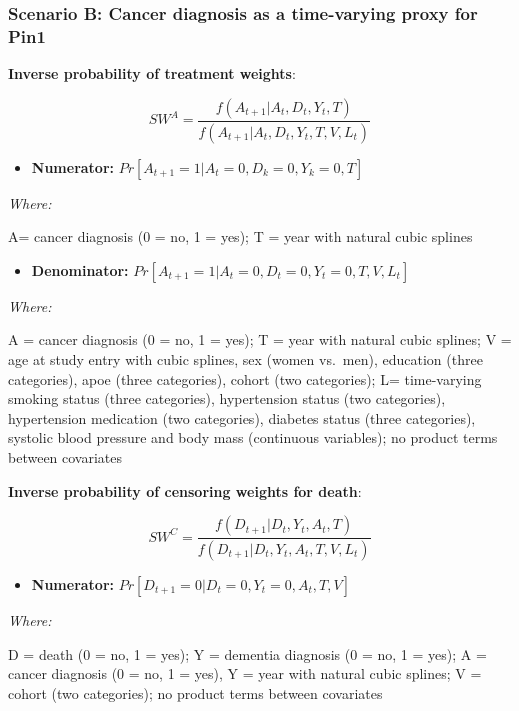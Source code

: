 \documentclass[
]{book}
\providecommand{\tightlist}{%
  \setlength{\itemsep}{0pt}\setlength{\parskip}{0pt}}
\begin{document}
\hypertarget{scenario-b-cancer-diagnosis-as-a-time-varying-proxy-for-pin1}{%
\subsubsection{Scenario B: Cancer diagnosis as a time-varying proxy for Pin1}\label{scenario-b-cancer-diagnosis-as-a-time-varying-proxy-for-pin1}}

\textbf{Inverse probability of treatment weights}:

\[SW^A = \frac{f(A_{t+1}|A_t, D_t, Y_t, T)}{f(A_{t+1}|A_t, D_t, Y_t, T, V, L_t)}\]

\begin{itemize}
\tightlist
\item
  \textbf{Numerator:} \(Pr[A_{t+1} = 1| A_t = 0, D_k = 0, Y_k = 0, T]\)
\end{itemize}

\emph{Where:}

A= cancer diagnosis (0 = no, 1 = yes); T = year with natural cubic splines

\begin{itemize}
\tightlist
\item
  \textbf{Denominator:} \(Pr[A_{t+1} = 1| A_t = 0, D_t = 0, Y_t = 0, T, V, L_t]\)
\end{itemize}

\emph{Where:}

A = cancer diagnosis (0 = no, 1 = yes); T = year with natural cubic splines; V = age at study entry with cubic splines, sex (women vs.~men), education (three categories), apoe (three categories), cohort (two categories); L= time-varying smoking status (three categories), hypertension status (two categories), hypertension medication (two categories), diabetes status (three categories), systolic blood pressure and body mass (continuous variables); no product terms between covariates

\textbf{Inverse probability of censoring weights for death}:

\[SW^C = \frac{f(D_{t+1}|D_t, Y_t, A_t, T)}{f(D_{t+1}|D_t, Y_t, A_t, T, V, L_t)}\]

\begin{itemize}
\tightlist
\item
  \textbf{Numerator:} \(Pr[D_{t+1} = 0|D_t = 0, Y_t = 0, A_t, T, V]\)
\end{itemize}

\emph{Where:}

D = death (0 = no, 1 = yes); Y = dementia diagnosis (0 = no, 1 = yes); A = cancer diagnosis (0 = no, 1 = yes), Y = year with natural cubic splines; V = cohort (two categories); no product terms between covariates
\end{document}
